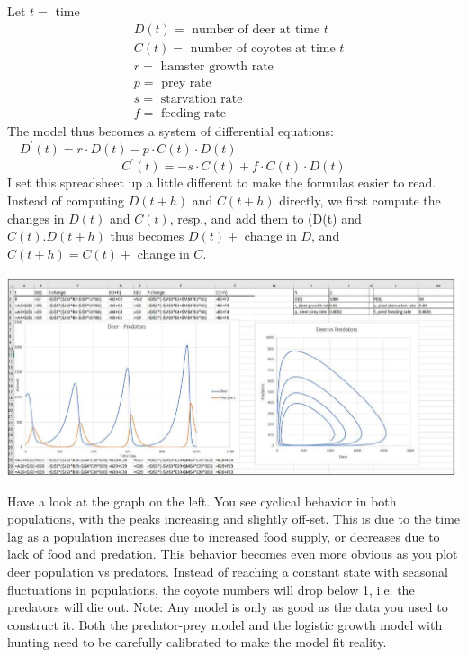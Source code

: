 \documentclass[10pt]{article}
\begin{document}
Let $t=$ time
$$
\begin{aligned}
&D(t)=\text { number of deer at time } t \\
&C(t)=\text { number of coyotes at time } t \\
&r=\text { hamster growth rate } \\
&p=\text { prey rate } \\
&s=\text { starvation rate } \\
&f=\text { feeding rate }
\end{aligned}
$$
The model thus becomes a system of differential equations: $\quad D^{\prime}(t)=r \cdot D(t)-p \cdot C(t) \cdot D(t)$
$$
C^{\prime}(t)=-s \cdot C(t)+f \cdot C(t) \cdot D(t)
$$
I set this spreadsheet up a little different to make the formulas easier to read. Instead of computing $D(t+h)$ and $C(t+h)$ directly, we first compute the changes in $D(t)$ and $C(t)$, resp., and add them to (D(t) and $C(t) . D(t+h)$ thus becomes $D(t)+$ change in $D$, and $C(t+h)=C(t)+$ change in $C$.

\includegraphics[max width=\textwidth]{2022_07_05_5945264bba2a5f6ba667g-15}

Have a look at the graph on the left. You see cyclical behavior in both populations, with the peaks increasing and slightly off-set. This is due to the time lag as a population increases due to increased food supply, or decreases due to lack of food and predation. This behavior becomes even more obvious as you plot deer population vs predators. Instead of reaching a constant state with seasonal fluctuations in populations, the coyote numbers will drop below 1, i.e. the predators will die out. Note: Any model is only as good as the data you used to construct it. Both the predator-prey model and the logistic growth model with hunting need to be carefully calibrated to make the model fit reality.
\end{document}
